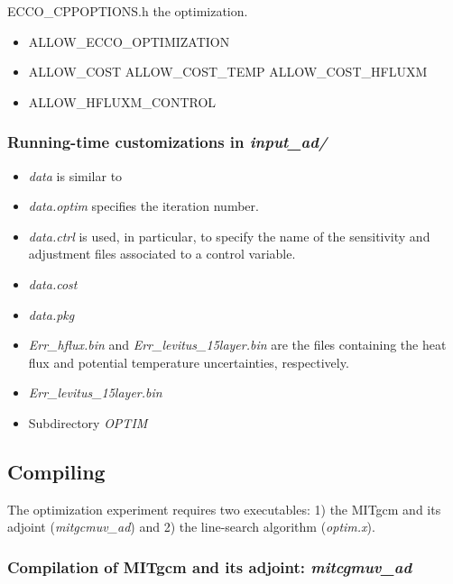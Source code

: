 ECCO\_CPPOPTIONS.h the optimization.

\begin{itemize}
\item ALLOW\_ECCO\_OPTIMIZATION

\item ALLOW\_COST ALLOW\_COST\_TEMP ALLOW\_COST\_HFLUXM

\item ALLOW\_HFLUXM\_CONTROL
\end{itemize}

\subsubsection{Running-time customizations in {\it input\_ad/}}

\begin{itemize}

\item {\it data} is similar to 

\item {\it data.optim} specifies the iteration number.

\item {\it data.ctrl} is used, in particular, to specify the
name of the sensitivity and adjustment files associated to a control
variable.

\item {\it data.cost} 

\item {\it data.pkg}

\item {\it Err\_hflux.bin} and {\it Err\_levitus\_15layer.bin} are the
files containing the heat flux and potential temperature uncertainties,
respectively.

\item {\it Err\_levitus\_15layer.bin}

\item Subdirectory {\it OPTIM}

\end{itemize}

\subsection{Compiling} 

The optimization experiment requires two executables: 1) the 
MITgcm and its adjoint ({\it mitgcmuv\_ad}) and 2) the line-search
algorithm ({\it optim.x}).

\subsubsection{Compilation of MITgcm and its adjoint: {\it mitcgmuv\_ad}}

